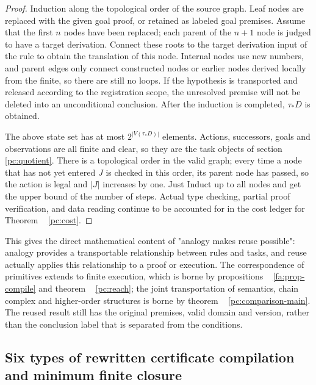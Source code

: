 \documentclass[11pt,a4paper]{article}
\theoremstyle{plain}
\theoremstyle{definition}
\theoremstyle{remark}
\begin{document}
\begin{CJK*}
\begin{proof}
Induction along the topological order of the source graph. Leaf nodes are replaced with the given goal proof, or retained as labeled goal premises. Assume that the first $n$ nodes have been replaced; each parent of the $n+1$ node is judged to have a target derivation. Connect these roots to the target derivation input of the rule to obtain the translation of this node. Internal nodes use new numbers, and parent edges only connect constructed nodes or earlier nodes derived locally from the finite, so there are still no loops. If the hypothesis is transported and released according to the registration scope, the unresolved premise will not be deleted into an unconditional conclusion. After the induction is completed, $\tau_*D$ is obtained.

The above state set has at most $2^{|V(\tau_*D)|}$ elements. Actions, successors, goals and observations are all finite and clear, so they are the task objects of section ~ \ref{pc:quotient}. There is a topological order in the valid graph; every time a node that has not yet entered $J$ is checked in this order, its parent node has passed, so the action is legal and $|J|$ increases by one. Just Induct up to all nodes and get the upper bound of the number of steps. Actual type checking, partial proof verification, and data reading continue to be accounted for in the cost ledger for Theorem ~ \ref{pc:cost}.\end{proof}


This gives the direct mathematical content of "analogy makes reuse possible": analogy provides a transportable relationship between rules and tasks, and reuse actually applies this relationship to a proof or execution. The correspondence of primitives extends to finite execution, which is borne by propositions ~ \ref{fa:prop-compile} and theorem ~ \ref{pc:reach}; the joint transportation of semantics, chain complex and higher-order structures is borne by theorem ~ \ref{pc:comparison-main}. The reused result still has the original premises, valid domain and version, rather than the conclusion label that is separated from the conditions.

\subsection { Six types of rewritten certificate compilation and minimum finite closure }\label{ar:closure}



\end{CJK*}
\end{document}
